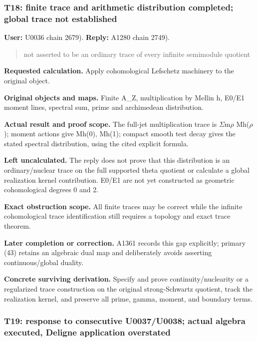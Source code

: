 \documentclass[10pt,a4paper,oneside]{report}
\begin{document}
\subsubsection{T18: finite trace and arithmetic distribution completed;
global trace not
established}\label{t18-finite-trace-and-arithmetic-distribution-completed-global-trace-not-established}

\textbf{User:} U0036
\protect{} chain 2679).
\textbf{Reply:} A1280
\protect{} chain 2749).

\begin{quote}
not asserted to be an ordinary trace of every infinite semimodule
quotient
\end{quote}

\textbf{Requested calculation.} Apply cohomological Lefschetz machinery
to the original object.

\textbf{Original objects and maps.} Finite A\_Z, multiplication by
Mellin h, E0/E1 moment lines, spectral sum, prime and archimedean
distribution.

\textbf{Actual result and proof scope.} The full-jet multiplication
trace is
\allowbreak{}\ensuremath{Σ}\allowbreak{}m\allowbreak{}\ensuremath{ρ}\allowbreak{}
Mh(\allowbreak{}\ensuremath{ρ}\allowbreak{}); moment actions give Mh(0),
Mh(1); compact smooth test decay gives the stated spectral distribution,
using the cited explicit formula.

\textbf{Left uncalculated.} The reply does not prove that this
distribution is an ordinary/nuclear trace on the full supported theta
quotient or calculate a global realization kernel contribution. E0/E1
are not yet constructed as geometric cohomological degrees 0 and 2.

\textbf{Exact obstruction scope.} All finite traces may be correct while
the infinite cohomological trace identification still requires a
topology and exact trace theorem.

\textbf{Later completion or correction.} A1361 records this gap
explicitly; primary (43) retains an algebraic dual map and deliberately
avoids asserting continuous/global duality.

\textbf{Concrete surviving derivation.} Specify and prove
continuity/nuclearity or a regularized trace construction on the
original strong-Schwartz quotient, track the realization kernel, and
preserve all prime, gamma, moment, and boundary terms.

\subsubsection{T19: response to consecutive U0037/U0038; actual algebra
executed, Deligne application
overstated}\label{t19-response-to-consecutive-u0037u0038-actual-algebra-executed-deligne-application-overstated}
\end{document}
